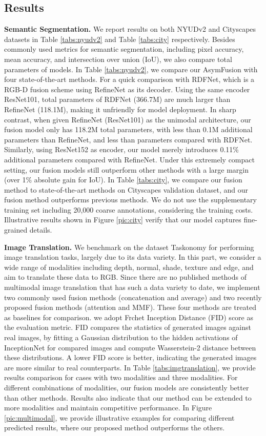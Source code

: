 \documentclass[sigconf]{acmart}
\begin{document}
\subsection{Results}
\textbf{Semantic Segmentation.} We report results on both NYUDv2 and Cityscapes datasets in Table \ref{tabs:nyudv2} and Table \ref{tabs:city} respectively. Besides commonly used metrics for semantic segmentation, including pixel accuracy, mean accuracy, and intersection over union (IoU), we also compare total parameters of models. In Table \ref{tabs:nyudv2}, we compare our AsymFusion with four state-of-the-art methods. For a quick comparison with RDFNet, which is a RGB-D fusion scheme using RefineNet as its decoder. Using the same encoder ResNet101, total parameters of RDFNet (366.7M) are much larger than RefineNet (118.1M), making it unfriendly for model deployment. In sharp contrast, when given RefineNet (ResNet101) as the unimodal architecture, our fusion model only has 118.2M total parameters, with less than 0.1M additional parameters than RefineNet, and less than  parameters compared with RDFNet. Similarly, using ResNet152 as encoder, our model merely introduces 0.11\% additional parameters compared with RefineNet. Under this extremely compact setting, our fusion models still outperform other methods with a large margin (over 1\% absolute gain for IoU). In Table \ref{tabs:city}, we compare our fusion method to state-of-the-art methods on Cityscapes validation dataset, and our fusion method outperforms previous methods. We do not use the supplementary training set including 20,000 coarse annotations, considering the training costs. Illustrative results shown in Figure \ref{pic:city} verify that our model captures fine-grained details.



\textbf{Image Translation.} We benchmark on the dataset Taskonomy for performing image translation tasks, largely due to its data variety. In this part, we consider a wide range of modalities including depth, normal, shade, texture and edge, and aim to translate these data to RGB. Since there are no published methods of multimodal image translation that has such a data variety to date, we implement two commonly used fusion methods (concatenation and average) and two recently proposed fusion methods (attention and MMF). These four methods are treated as baselines for comparison. we adopt Frchet Inception Distance (FID) score as the evaluation metric. FID compares the statistics of generated images against real images, by fitting a Gaussian distribution to the hidden activations of InceptionNet for compared images and compute Wasserstein-2 distance between these distributions. A lower FID score is better, indicating the generated images are more similar to real counterparts. In Table \ref{tabs:imgtranslation}, we provide results comparison for cases with two modalities and three modalities. For different combinations of modalities, our fusion models are  consistently better than other methods. Results also indicate that our method can be extended to more modalities and maintain competitive performance. In Figure \ref{pic:multimodal}, we provide illustrative examples for comparing different predicted results, where our proposed method outperforms the others.
\end{document}
